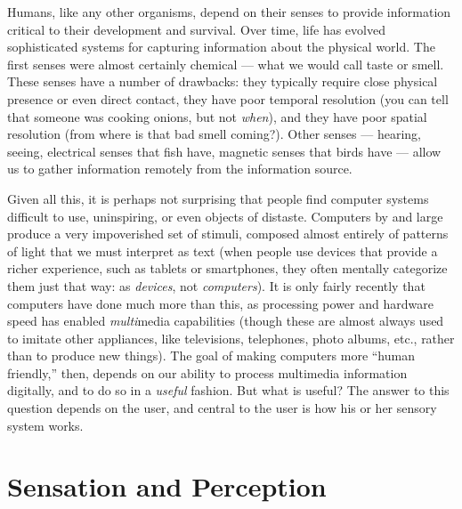 Humans, like any other organisms, depend on their senses to provide
information critical to their development and survival. Over time,
life has evolved sophisticated systems for capturing information about
the physical world. The first senses were almost certainly chemical
--- what we would call taste or smell. These senses have a number of
drawbacks: they typically require close physical presence or even
direct contact, they have poor temporal resolution (you can tell that
someone was cooking onions, but not \emph{when}), and they have poor
spatial resolution (from where is that bad smell coming?). Other
senses --- hearing, seeing, electrical senses that fish have, magnetic
senses that birds have --- allow us to gather information remotely
from the information source.

Given all this, it is perhaps not surprising that people find computer
systems difficult to use, uninspiring, or even objects of
distaste. Computers by and large produce a very impoverished set of
stimuli, composed almost entirely of patterns of light that we must
interpret as text (when people use devices that provide a richer
experience, such as tablets or smartphones, they often mentally
categorize them just that way: as \emph{devices}, not
\emph{computers}). It is only fairly recently that computers have done
much more than this, as processing power and hardware speed has
enabled \emph{multi}media capabilities (though these are almost always
used to imitate other appliances, like televisions, telephones, photo
albums, etc., rather than to produce new things). The goal of making
computers more ``human friendly,'' then, depends on our ability to
process multimedia information digitally, and to do so in a
\emph{useful} fashion. But what is useful? The answer to this question
depends on the user, and central to the user is how his or her sensory
system works.

\section{Sensation and Perception}

